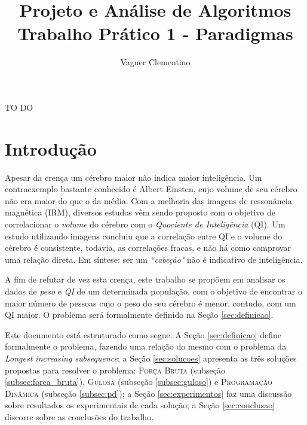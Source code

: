 \documentclass[12pt]{article}
\title{Projeto e Análise de Algoritmos\\ Trabalho Prático 1 - Paradigmas}
\author{Vagner Clementino\inst{1}}
\begin{document}
 

\maketitle

     
\begin{resumo} 
 TO DO
\end{resumo}


\section{Introdução}
\label{sec:intro}

Apesar da crença um cérebro maior não indica maior inteligência. Um contraexemplo bastante conhecido é Albert Einsten, cujo volume de seu cérebro não era maior do que o da média. Com a melhoria das imagens de ressonância magnética (IRM), diversos estudos vêm sendo proposto com o objetivo de correlacionar o \textit{volume} do cérebro com o \textit{Quociente de Inteligência} (QI). Um estudo utilizando imagens concluiu que a correlação entre QI e o volume do cérebro é consistente, todavia, as correlações fracas, e não há como comprovar uma relação direta. Em síntese: ser um \textit{``cabeção"} não é indicativo de inteligência.

A fim de refutar de vez esta crença, este trabalho se propõem em analisar os dados de \emph{peso} e \emph{QI} de um determinada população, com o objetivo de encontrar o maior número de pessoas cujo o peso do seu cérebro é menor, contudo, com um QI maior. O problema será formalmente definido na Seção \ref{sec:definicao}{}.

Este documento está estruturado como segue. A Seção \ref{sec:definicao} define formalmente o problema, fazendo uma relação do mesmo com o problema da \textit{Longest increasing subsequence}{}; a Seção \ref{sec:solucoes} apresenta as três soluções propostas para resolver o problema: \textsc{Força Bruta} (subseção \ref{subsec:forca_bruta}{}), \textsc{Gulosa} (subseção \ref{subsec:guloso}) e \textsc{Programação Dinâmica} (subseção \ref{subsec:pd}); a Seção \ref{sec:experimentos}{} faz uma discussão sobre resultados os experimentais de cada solução; a Seção \ref{sec:conclusao} discorre sobre as conclusões do trabalho.
\end{document}
